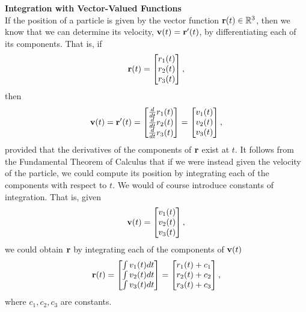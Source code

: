 \item 
\textbf{Integration with Vector-Valued Functions}\\
If the position of a particle is given by the vector function $\mathbf{r}(t) \in \mathbb{R}^3$, then we know that we can determine its velocity, $\mathbf{v}(t)= \mathbf{r}'(t)$, by differentiating each of its components. That is, if 
\begin{align*}
  \mathbf{r}(t) = \begin{bmatrix} r_1(t) \\ r_2(t) \\ r_3(t) \end{bmatrix},
\end{align*}
then
\begin{align*}
  \mathbf{v}(t)= \mathbf{r}'(t) = \begin{bmatrix} \frac{d}{dt} r_1(t) \\ \frac{d}{dt} r_2(t) \\ \frac{d}{dt} r_3(t) \end{bmatrix} = \begin{bmatrix} v_1(t) \\ v_2(t) \\ v_3(t) \end{bmatrix},
\end{align*}
provided that the derivatives of the components of $\mathbf{r}$ exist at $t$. It follows from the Fundamental Theorem of Calculus that if we were instead given the velocity of the particle, we could compute its position by integrating each of the components with respect to $t$. We would of course introduce constants of integration. That is, given
\begin{align*}
  \mathbf{v}(t) = \begin{bmatrix} v_1(t) \\ v_2(t) \\ v_3(t) \end{bmatrix}, 
\end{align*}
we could obtain $\mathbf{r}$ by integrating each of the components of $\mathbf{v}(t)$
\begin{align*}
  \mathbf{r}(t) = \begin{bmatrix} \int v_1(t) dt \\ \int v_2(t) dt \\ \int v_3(t) dt \end{bmatrix} = \begin{bmatrix} r_1(t) + c_1 \\ r_2(t) +c_2 \\ r_3(t) +c_3 \end{bmatrix},
\end{align*}
where $c_1,c_2,c_3$ are constants. 

